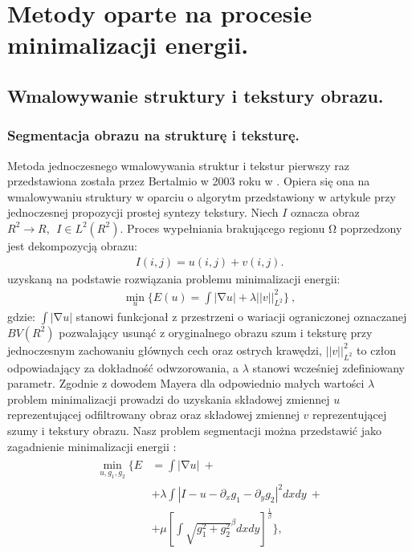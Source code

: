 \documentclass[12pt, twoside, openany]{report}
\theoremstyle{definition}
\begin{document}
\chapter{Metody oparte na procesie minimalizacji energii.}
\section{Wmalowywanie struktury i tekstury obrazu.}\label{sec:StructureTextureNavierStokes}
\subsection{Segmentacja obrazu na strukturę i teksturę.}
Metoda jednoczesnego wmalowywania struktur i tekstur pierwszy raz przedstawiona została przez Bertalmio w 2003 roku w \cite{NavierStokesAndTexturePropagation}. Opiera się ona na wmalowywaniu struktury w oparciu o algorytm przedstawiony w artykule przy jednoczesnej propozycji prostej syntezy tekstury. Niech $I$ oznacza obraz $R^2\to R,\ \ I\in L^2(R^2)$. Proces wypełniania brakującego regionu $\mathrm{\Omega }$ poprzedzony jest dekompozycją obrazu:
\begin{align}
I\left(i,j\right)=u\left(i,j\right)+v\left(i,j\right).
\label{STRUCTURETEXTURE1}
\end{align}
uzyskaną na podstawie rozwiązania problemu minimalizacji energii:
\begin{align} 
{\mathop{\mathrm{min}}_{u} \Biggl\{E\left(u\right)=\int{\left|\mathrm{\nabla }u\right|+\lambda {\left|\left|v\right|\right|}^2_{L^2}}\Biggr\}\ },
\label{STRUCTURETEXTURE2}
\end{align}
gdzie: $\int{\left|\mathrm{\nabla }u\right|}$ stanowi funkcjonał z przestrzeni o wariacji ograniczonej oznaczanej $BV(R^2)$ pozwalający usunąć z oryginalnego obrazu szum i teksturę przy jednoczesnym zachowaniu głównych cech oraz ostrych krawędzi, ${\left|\left|v\right|\right|}^2_{L^2}$ to człon odpowiadający za dokładność odwzorowania, a $\lambda $ stanowi wcześniej zdefiniowany parametr. Zgodnie z dowodem Mayera \cite{meyer2001oscillating} dla odpowiednio małych wartości $\lambda $ problem minimalizacji prowadzi do uzyskania składowej zmiennej $u$ reprezentującej odfiltrowany obraz oraz składowej zmiennej $v$ reprezentującej szumy i tekstury obrazu. Nasz problem segmentacji można przedstawić jako zagadnienie minimalizacji energii \cite{vese2003modeling}:
\begin{align}
\begin{aligned} 
\mathop{\mathrm{min}}_{u,g_1,g_2} \Biggl\{E &= \int{\left|\mathrm{\nabla }u\right| } \ + \\
&+\lambda \int{\left|I-u-\partial_x g_1- \partial_y g_2 \right|}^2dxdy \ +\\
&+ \mu {\left[\int{{\sqrt{g^2_1+g^2_2}}^\beta dxdy}\right]}^{\frac{1}{\beta}}\Biggr\},
\end{aligned}
\end{align}
\end{document}
